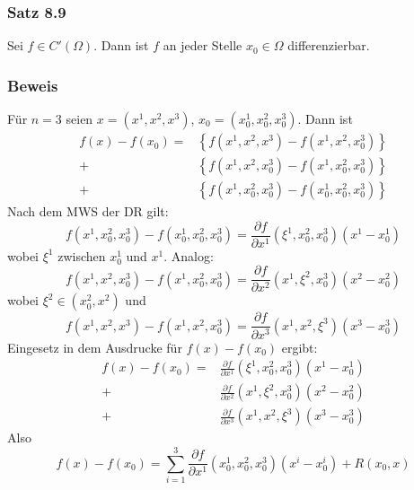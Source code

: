 \subsubsection*{Satz 8.9}
Sei $f\in C'\left(\Omega\right)$. Dann ist $f$ an jeder Stelle $x_0\in\Omega$ differenzierbar. 

\subsubsection*{Beweis}
Für $n=3$ seien $x=\left( x^1,x^2,x^3\right)$, $x_0=\left( x_0^1,x_0^2,x_0^3\right)$. Dann ist 
\begin{align*}
f\left( x \right) - f\left( {{x_0}} \right) = &\left\{ {f\left( {{x^1},{x^2},{x^3}} \right) - f\left( {{x^1},{x^2},x_0^3} \right)} \right\}\\
+ &\left\{ {f\left( {{x^1},{x^2},x_0^3} \right) - f\left( {{x^1},x_0^2,x_0^3} \right)} \right\}\\
+ &\left\{ {f\left( {{x^1},x_0^2,x_0^3} \right) - f\left( {x_0^1,x_0^2,x_0^3} \right)} \right\}
\end{align*}
Nach dem MWS der DR gilt: \[f\left( {{x^1},x_0^2,x_0^3} \right) - f\left( {x_0^1,x_0^2,x_0^3} \right) = \frac{{\partial f}}{{\partial {x^1}}}\left( {{\xi ^1},x_0^2,x_0^3} \right)\left( x^1-x_0^1\right)\] 
wobei $\xi^1$ zwischen $x_0^1$ und $x^1$. Analog: 
\[f\left( {{x^1},{x^2},x_0^3} \right) - f\left( {{x^1},x_0^2,x_0^3} \right) = \frac{{\partial f}}{{\partial {x^2}}}\left( {{x^1},{\xi ^2},x_0^3} \right)\left( {{x^2} - x_0^2} \right)\] wobei $\xi^2\in\left(x_0^2,x^2\right)$ 
und \[f\left( {{x^1},{x^2},{x^3}} \right) - f\left( {{x^1},{x^2},x_0^3} \right) = \frac{{\partial f}}{{\partial {x^3}}}\left( {{x^1},{x^2},{\xi ^3}} \right)\left( {{x^3} - x_0^3} \right)\]
Eingesetz in dem Ausdrucke für $f(x)-f(x_0)$ ergibt: 
\begin{align*}
f\left( x \right) - f\left( {{x_0}} \right) = &\frac{{\partial f}}{{\partial {x^1}}}\left( {{\xi ^1},x_0^2,x_0^3} \right)\left( {{x^1} - x_0^1} \right)\\
+ &\frac{{\partial f}}{{\partial {x^2}}}\left( {{x^1},{\xi ^2},x_0^3} \right)\left( {{x^2} - x_0^2} \right)\\ + &\frac{{\partial f}}{{\partial {x^3}}}\left( {{x^1},{x^2},{\xi ^3}} \right)\left( {{x^3} - x_0^3} \right)
\end{align*}
Also
\[f\left( x \right) - f\left( {{x_0}} \right) = \sum\limits_{i = 1}^3 {\frac{{\partial f}}{{\partial {x^1}}}\left( {x_0^1,x_0^2,x_0^3} \right)\left( {{x^i} - x_0^i} \right)}  + R\left( {{x_0},x} \right)\]

